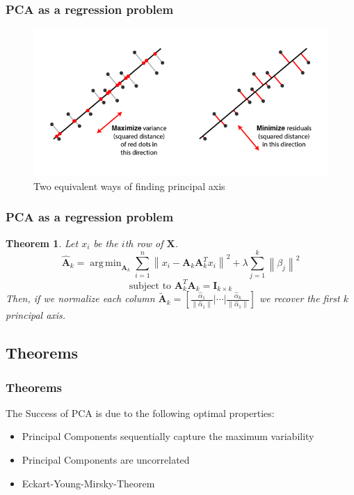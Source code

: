 \documentclass{beamer}
\theoremstyle{plain}
\newtheorem{thm}{Theorem}
\theoremstyle{definition}
\newcommand{\mat}[1]{\mathbf{#1}}
\DeclareMathOperator*{\argmin}{arg\,min}
\newcommand{\norm}[1]{\left\lVert #1 \right\rVert}
\begin{document}
\begin{frame}
\frametitle{PCA as a regression problem}
\begin{figure}
\centering
\includegraphics[width = \textwidth]{figures/pca_projection_explanation.png}
\caption{Two equivalent ways of finding principal axis}
\end{figure}
\end{frame}

\begin{frame}
\frametitle{PCA as a regression problem}
\begin{thm} 
Let $x_i$ be the $i$th row of $\mat X$.
$$\mat{\hat{A}}_k = \argmin_{\mat{A}_k} \sum_{i=1}^{n} \norm{x_i - \mat{A}_k \mat{A}_k^Tx_i}^2 + \lambda \sum_{j=1}^{k}\norm{\beta_j}^2$$
$$\text{subject to }\mat{A}_k^T\mat{A}_k = \mat{I}_{k \times k}$$
Then, if we normalize each column $\mat{\tilde{A}}_k = \left[ \frac{\hat{\alpha}_1}{\norm{\hat{\alpha}_1}} \bigg\lvert \cdots \bigg\rvert \frac{\hat{\alpha}_k}{\norm{\hat{\alpha}_1}} \right]$ we recover the first $k$ principal axis.
\end{thm}

\end{frame}
\subsection{Theorems}

\begin{frame}
\frametitle{Theorems}
The Success of PCA is due to the following optimal properties:
\begin{itemize}
\item Principal Components sequentially capture the maximum variability
\item Principal Components are uncorrelated
\item Eckart-Young-Mirsky-Theorem
\end{itemize}
\end{frame}
\end{document}
